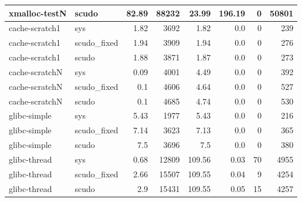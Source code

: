 \documentclass[a4paper,11pt,oneside]{report}
\begin{document}
\begin{longtable}[h]{l l r r r r r r}
  \midrule
  xmalloc-testN & scudo & 82.89 & 88232 & 23.99 & 196.19 & 0 & 50801 \\
  \midrule
  cache-scratch1 & sys & 1.82 & 3692 & 1.82 & 0.0 & 0 & 239 \\
  \midrule
  cache-scratch1 & scudo\_fixed & 1.94 & 3909 & 1.94 & 0.0 & 0 & 276 \\
  \midrule
  cache-scratch1 & scudo & 1.88 & 3871 & 1.87 & 0.0 & 0 & 273 \\
  \midrule
  cache-scratchN & sys & 0.09 & 4001 & 4.49 & 0.0 & 0 & 392 \\
  \midrule
  cache-scratchN & scudo\_fixed & 0.1 & 4606 & 4.64 & 0.0 & 0 & 527 \\
  \midrule
  cache-scratchN & scudo & 0.1 & 4685 & 4.74 & 0.0 & 0 & 530 \\
  \midrule
  glibc-simple & sys & 5.43 & 1977 & 5.43 & 0.0 & 0 & 216 \\
  \midrule
  glibc-simple & scudo\_fixed & 7.14 & 3623 & 7.13 & 0.0 & 0 & 365 \\
  \midrule
  glibc-simple & scudo & 7.5 & 3696 & 7.5 & 0.0 & 0 & 380 \\
  \midrule
  glibc-thread & sys & 0.68 & 12809 & 109.56 & 0.03 & 70 & 4955 \\
  \midrule
  glibc-thread & scudo\_fixed & 2.66 & 15507 & 109.55 & 0.04 & 9 & 4254 \\
  \midrule
  glibc-thread & scudo & 2.9 & 15431 & 109.55 & 0.05 & 15 & 4257 \\
  \bottomrule
\end{longtable}
\end{document}
